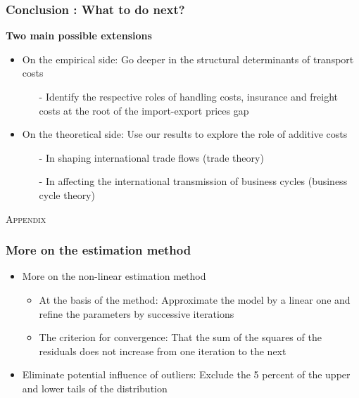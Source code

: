 \documentclass[10 pt,Helvetica, french]{beamer}
\newcommand{\beginbackup}{
   \newcounter{framenumbervorappendix}
   \setcounter{framenumbervorappendix}{\value{framenumber}}
}
\begin{document}
\begin{frame}
\frametitle{Conclusion : What to do next?}

\textbf{Two main possible extensions}
\begin{itemize}
\item On the empirical side: Go deeper in the structural determinants of transport costs\vspace{0.1cm}
\begin{itemize}
\item[-] Identify the respective roles of handling costs, insurance and freight costs at the root of the import-export prices gap \vspace{0.2cm}
\end{itemize}
\item On the theoretical side: Use our results to explore the role of additive costs  \vspace{0.1cm}
\begin{itemize}
\item[-] In shaping international trade flows (trade theory) \vspace{0.1cm}
\item[-] In affecting the international transmission of business cycles (business cycle theory)
\end{itemize}
\end{itemize}
\end{frame}


\beginbackup



\appendix


\begin{frame}
\large
\center
\textsc{Appendix}
\normalsize
\end{frame}

\begin{frame}[label=app_estimation_method]
\frametitle{More on the estimation method}
\begin{itemize}
\item More on the non-linear estimation method
\begin{itemize}
\item At the basis of the method: Approximate the model by a linear one and refine the parameters by successive iterations \vspace{0.1cm}
\item The criterion for convergence: That the sum of the squares of the residuals does not increase from one iteration to the next \vspace{0.1cm}
\end{itemize}
\item Eliminate potential influence of outliers: Exclude the 5 percent of the upper and lower tails of the distribution
\end{itemize}

\hyperlink{slide_estimation_method}{}
\end{frame}
\end{document}
